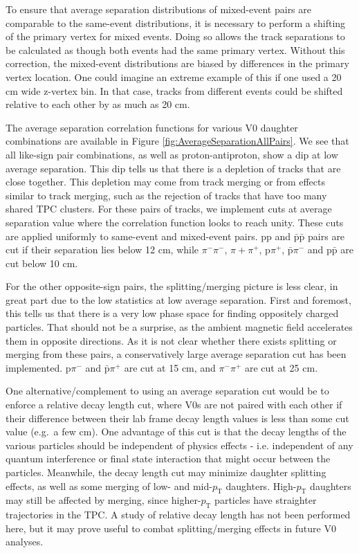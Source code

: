 To ensure that average separation distributions of mixed-event pairs are comparable to the same-event distributions, it is necessary to perform a shifting of the primary vertex for mixed events.  
Doing so allows the track separations to be calculated as though both events had the same primary vertex.  
Without this correction, the mixed-event distributions are biased by differences in the primary vertex location.  
One could imagine an extreme example of this if one used a 20 cm wide z-vertex bin.  
In that case, tracks from different events could be shifted relative to each other by as much as 20 cm. 

The average separation correlation functions for various V0 daughter combinations are available in Figure \ref{fig:AverageSeparationAllPairs}.  
We see that all like-sign pair combinations, as well as proton-antiproton, show a dip at low average separation.  
This dip tells us that there is a depletion of tracks that are close together. 
This depletion may come from track merging or from effects similar to track merging, such as the rejection of tracks that have too many shared TPC clusters.
For these pairs of tracks, we implement cuts at average separation value where the correlation function looks to reach unity.
These cuts are applied uniformly to same-event and mixed-event pairs.
pp and $\bar{\mathrm{p}}\bar{\mathrm{p}}$ pairs are cut if their separation lies below 12 cm, while $\pi^-\pi^-$, $\pi+\pi^+$, p$\pi^+$, $\bar{\mathrm{p}}\pi^-$ and p$\bar{\mathrm{p}}$ are cut below 10 cm.

For the other opposite-sign pairs, the splitting/merging picture is less clear, in great part due to the low statistics at low average separation.
First and foremost, this tells us that there is a very low phase space for finding oppositely charged particles. 
That should not be a surprise, as the ambient magnetic field accelerates them in opposite directions.
As it is not clear whether there exists splitting or merging from these pairs, a conservatively large average separation cut has been implemented. p$\pi^-$ and $\bar{\mathrm{p}}\pi^+$ are cut at 15 cm, and $\pi^-\pi^+$ are cut at 25 cm.

One alternative/complement to using an average separation cut would be to enforce a relative decay length cut, where V0s are not paired with each other if their difference between their lab frame decay length values is less than some cut value (e.g.\ a few cm).  
One advantage of this cut is that the decay lengths of the various particles should be independent of physics effects - i.e. independent of any quantum interference or final state interaction that might occur between the particles.  
Meanwhile, the decay length cut may minimize daughter splitting effects, as well as some merging of low- and mid-$p_{\mathrm{T}}$ daughters.  
High-$p_{\mathrm{T}}$ daughters may still be affected by merging, since higher-$p_{\mathrm{T}}$ particles have straighter trajectories in the TPC.  
A study of relative decay length has not been performed here, but it may prove useful to combat splitting/merging effects in future V0 analyses.

